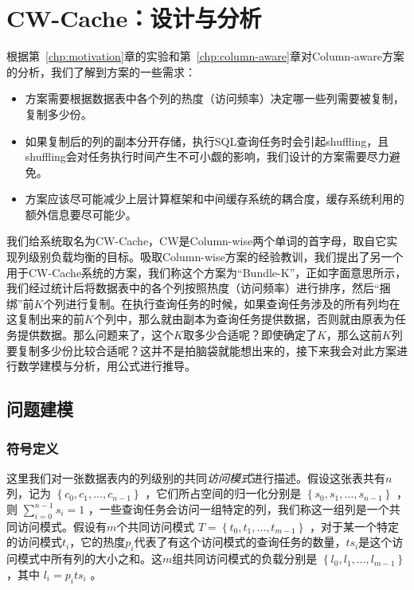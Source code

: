 \chapter{CW-Cache：设计与分析}
\label{chp:cw-cache}

\par 根据第~\ref{chp:motivation}章的实验和第~\ref{chp:column-aware}章对Column-aware方案的分析，我们了解到方案的一些需求：
\begin{itemize}
    \item 方案需要根据数据表中各个列的热度（访问频率）决定哪一些列需要被复制，复制多少份。
    \item 如果复制后的列的副本分开存储，执行SQL查询任务时会引起shuffling，且shuffling会对任务执行时间产生不可小觑的影响，我们设计的方案需要尽力避免。
    \item 方案应该尽可能减少上层计算框架和中间缓存系统的耦合度，缓存系统利用的额外信息要尽可能少。
\end{itemize}

\par 我们给系统取名为CW-Cache，CW是Column-wise两个单词的首字母，取自它实现列级别负载均衡的目标。吸取Column-wise方案的经验教训，我们提出了另一个用于CW-Cache系统的方案，我们称这个方案为“Bundle-K”，正如字面意思所示，我们经过统计后将数据表中的各个列按照热度（访问频率）进行排序，然后“捆绑”前$K$个列进行复制。在执行查询任务的时候，如果查询任务涉及的所有列均在这复制出来的前$K$个列中，那么就由副本为查询任务提供数据，否则就由原表为任务提供数据。那么问题来了，这个$K$取多少合适呢？即使确定了$K$，那么这前$K$列要复制多少份比较合适呢？这并不是拍脑袋就能想出来的，接下来我会对此方案进行数学建模与分析，用公式进行推导。

\section{问题建模}
\label{sec:bundle-k-model}

\subsection{符号定义}

\par 这里我们对一张数据表内的列级别的共同\emph{访问模式}进行描述。假设这张表共有$n$列，记为 $\left\{c_{0}, c_{1}, \dots, c_{n-1}\right\}$ ，它们所占空间的归一化分别是 $\left\{s_{0}, s_{1}, \dots, s_{n-1}\right\}$ ，则 $\sum_{i=0}^{n-1} s_i = 1$ ，一些查询任务会访问一组特定的列，我们称这一组列是一个共同访问模式。假设有$m$个共同访问模式 $T = \left\{t_{0}, t_{1}, \dots, t_{m-1}\right\}$ ，对于某一个特定的访问模式$t_i$，它的热度$p_i$代表了有这个访问模式的查询任务的数量，$ts_i$是这个访问模式中所有列的大小之和。这$m$组共同访问模式的负载分别是 $\left\{l_{0}, l_{1}, \dots, l_{m-1}\right\}$ ，其中 $l_i = p_i ts_i$ 。

